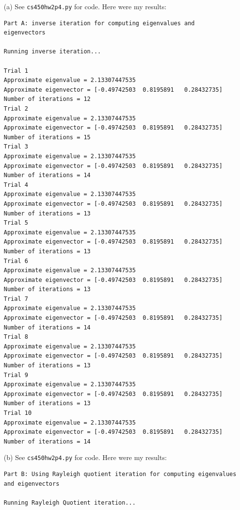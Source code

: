 \documentclass[10pt]{article}
\begin{document}

\begin{itemize}

\item[(a)] See \verb+cs450hw2p4.py+ for code. Here were my results:

\begin{verbatim}
Part A: inverse iteration for computing eigenvalues and eigenvectors

Running inverse iteration...

Trial 1
Approximate eigenvalue = 2.13307447535
Approximate eigenvector = [-0.49742503  0.8195891   0.28432735]
Number of iterations = 12
Trial 2
Approximate eigenvalue = 2.13307447535
Approximate eigenvector = [-0.49742503  0.8195891   0.28432735]
Number of iterations = 15
Trial 3
Approximate eigenvalue = 2.13307447535
Approximate eigenvector = [-0.49742503  0.8195891   0.28432735]
Number of iterations = 14
Trial 4
Approximate eigenvalue = 2.13307447535
Approximate eigenvector = [-0.49742503  0.8195891   0.28432735]
Number of iterations = 13
Trial 5
Approximate eigenvalue = 2.13307447535
Approximate eigenvector = [-0.49742503  0.8195891   0.28432735]
Number of iterations = 13
Trial 6
Approximate eigenvalue = 2.13307447535
Approximate eigenvector = [-0.49742503  0.8195891   0.28432735]
Number of iterations = 13
Trial 7
Approximate eigenvalue = 2.13307447535
Approximate eigenvector = [-0.49742503  0.8195891   0.28432735]
Number of iterations = 14
Trial 8
Approximate eigenvalue = 2.13307447535
Approximate eigenvector = [-0.49742503  0.8195891   0.28432735]
Number of iterations = 13
Trial 9
Approximate eigenvalue = 2.13307447535
Approximate eigenvector = [-0.49742503  0.8195891   0.28432735]
Number of iterations = 13
Trial 10
Approximate eigenvalue = 2.13307447535
Approximate eigenvector = [-0.49742503  0.8195891   0.28432735]
Number of iterations = 14
\end{verbatim}

\item[(b)] See \verb+cs450hw2p4.py+ for code. Here were my results:

\begin{verbatim}
Part B: Using Rayleigh quotient iteration for computing eigenvalues and eigenvectors

Running Rayleigh Quotient iteration...


\end{verbatim}
\end{itemize}
\end{document}

